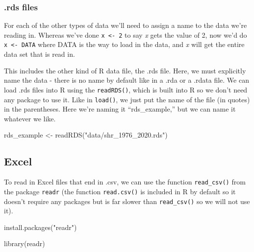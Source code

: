 \documentclass[
  a4paper,
]{krantz}
\makeatletter
\newenvironment{Shaded}{\begin{snugshade}}{\end{snugshade}}
\newcommand{\FunctionTok}[1]{\textcolor[rgb]{0.00,0.00,0.00}{#1}}
\newcommand{\NormalTok}[1]{#1}
\newcommand{\OtherTok}[1]{\textcolor[rgb]{0.56,0.35,0.01}{#1}}
\newcommand{\StringTok}[1]{\textcolor[rgb]{0.31,0.60,0.02}{#1}}
\newenvironment{kframe}{%
\medskip{}
\setlength{\fboxsep}{.8em}
 \def\at@end@of@kframe{}%
 \ifinner\ifhmode%
  \def\at@end@of@kframe{\end{minipage}}%
  \begin{minipage}{\columnwidth}%
 \fi\fi%
 \def\FrameCommand##1{\hskip\@totalleftmargin \hskip-\fboxsep
 \colorbox{shadecolor}{##1}\hskip-\fboxsep
     \hskip-\linewidth \hskip-\@totalleftmargin \hskip\columnwidth}%
 \MakeFramed {\advance\hsize-\width
   \@totalleftmargin\z@ \linewidth\hsize
   \@setminipage}}%
 {\par\unskip\endMakeFramed%
 \at@end@of@kframe}
\renewenvironment{Shaded}{\begin{kframe}}{\end{kframe}}
\makeatother
\begin{document}
\hypertarget{rds-files}{%
\subsubsection{.rds files}\label{rds-files}}

For each of the other types of data we'll need to assign a
name to the data we're reading in. Whereas we've done
\texttt{x\ \textless{}-\ 2} to say \emph{x} gets the value
of 2, now we'd do \texttt{x\ \textless{}-\ DATA} where DATA
is the way to load in the data, and \emph{x} will get the
entire data set that is read in.

This includes the other kind of R data file, the .rds file.
Here, we must explicitly name the data - there is no name by
default like in a .rda or a .rdata file. We can load .rds
files into R using the \texttt{readRDS()}, which is built
into R so we don't need any package to use it. Like in
\texttt{load()}, we just put the name of the file (in
quotes) in the parentheses. Here we're naming it
``rds\_example,'' but we can name it whatever we like.

\begin{Shaded}
\begin{Highlighting}[]
\NormalTok{rds\_example }\OtherTok{\textless{}{-}} \FunctionTok{readRDS}\NormalTok{(}\StringTok{"data/shr\_1976\_2020.rds"}\NormalTok{)}
\end{Highlighting}
\end{Shaded}

\hypertarget{excel}{%
\subsection{Excel}\label{excel}}

To read in Excel files that end in .csv, we can use the
function \texttt{read\_csv()} from the package
\texttt{readr} (the function \texttt{read.csv()} is included
in R by default so it doesn't require any packages but is
far slower than \texttt{read\_csv()} so we will not use it).

\begin{Shaded}
\begin{Highlighting}[]
\FunctionTok{install.packages}\NormalTok{(}\StringTok{"readr"}\NormalTok{)}
\end{Highlighting}
\end{Shaded}

\begin{Shaded}
\begin{Highlighting}[]
\FunctionTok{library}\NormalTok{(readr)}
\end{Highlighting}
\end{Shaded}
\end{document}
